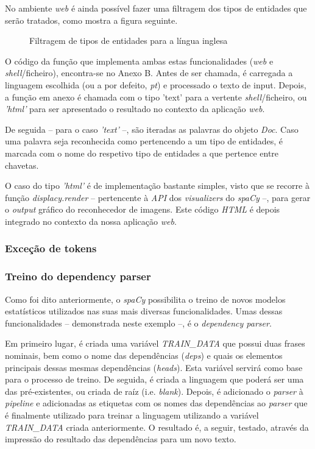 \documentclass[12pt]{article}
\begin{document}
No ambiente \textit{web} é ainda possível fazer uma filtragem dos tipos de entidades que serão tratados, como mostra a figura seguinte.

\begin{figure}[!ht]
	\centering
	\caption{Filtragem de tipos de entidades para a língua inglesa }
\end{figure}

O código da função que implementa ambas estas funcionalidades (\textit{web} e \textit{shell}/ficheiro), encontra-se no Anexo B. Antes de ser chamada, é carregada a linguagem
escolhida (ou a por defeito, \textit{pt}) e processado o texto de input. Depois, a função em anexo é chamada com o tipo 'text' para a vertente \textit{shell}/ficheiro, ou
\textit{'html'} para ser apresentado o resultado no contexto da aplicação \textit{web}.

De seguida -- para o caso  \textit{'text'} --, são iteradas as palavras do objeto \textit{Doc}. Caso uma palavra seja reconhecida como pertencendo a um tipo de entidades, é marcada
com o nome do respetivo tipo de entidades a que pertence entre chavetas.

O caso do tipo \textit{'html'} é de implementação bastante simples, visto que se recorre à função \textit{displacy.render} -- pertencente à \textit{API} dos \textit{visualizers} do
\textit{spaCy} --, para gerar o \textit{output} gráfico do reconhecedor de imagens. Este código \textit{HTML} é depois integrado no contexto da nossa aplicação \textit{web}.

\subsubsection{Exceção de tokens}
\subsubsection{Treino do dependency parser}

Como foi dito anteriormente, o \textit{spaCy} possibilita o treino de novos modelos estatísticos utilizados nas suas mais diversas funcionalidades. Umas dessas funcionalidades --
demonstrada neste exemplo --, é o \textit{dependency parser}.

Em primeiro lugar, é criada uma variável \textit{TRAIN\_DATA} que possui duas frases nominais, bem como o nome das dependências (\textit{deps}) e quais os elementos principais dessas
mesmas dependências (\textit{heads}). Esta variável servirá como base para o processo de treino. De seguida, é criada a linguagem que poderá ser uma das pré-existentes, ou criada de
raíz (i.e. \textit{blank}). Depois, é adicionado o \textit{parser} à \textit{pipeline} e adicionadas as etiquetas com os nomes das dependências ao \textit{parser} que é finalmente
utilizado para treinar a linguagem utilizando a variável \textit{TRAIN\_DATA} criada anteriormente. O resultado é, a seguir,
testado, através da impressão do resultado das dependências para um novo texto.
\end{document}
